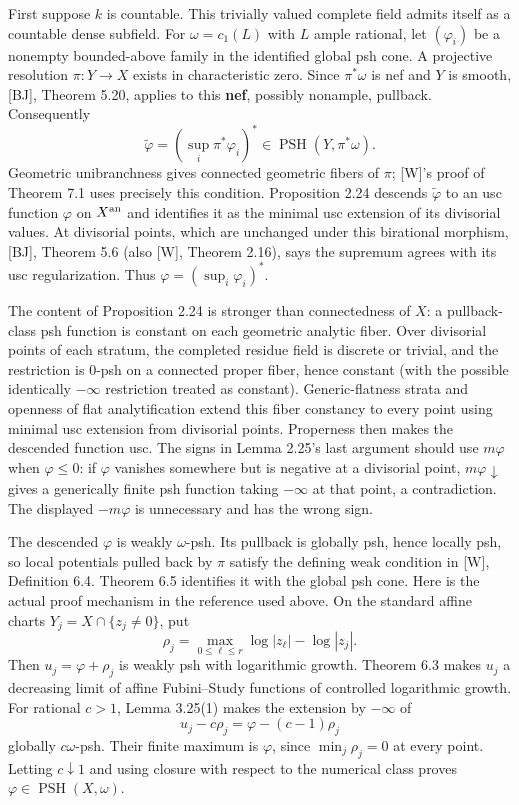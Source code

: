 \documentclass[11pt]{article}
\begin{document}
First suppose \(k\) is countable. This trivially valued complete field
admits itself as a countable dense subfield. For \(\omega=c_1(L)\) with
\(L\) ample rational, let \((\varphi_i)\) be a nonempty bounded-above
family in the identified global psh cone. A projective resolution
\(\pi:Y\to X\) exists in characteristic zero. Since \(\pi^*\omega\) is
nef and \(Y\) is smooth, {[}BJ{]}, Theorem 5.20, applies to this
\textbf{nef}, possibly nonample, pullback. Consequently
\[\widetilde\varphi=\left(\sup_i\pi^*\varphi_i\right)^*\in\operatorname{PSH}(Y,\pi^*\omega).\]
Geometric unibranchness gives connected geometric fibers of \(\pi\);
{[}W{]}'s proof of Theorem 7.1 uses precisely this condition.
Proposition 2.24 descends \(\widetilde\varphi\) to an usc function
\(\varphi\) on \(X^{\rm an}\) and identifies it as the minimal usc
extension of its divisorial values. At divisorial points, which are
unchanged under this birational morphism, {[}BJ{]}, Theorem 5.6 (also
{[}W{]}, Theorem 2.16), says the supremum agrees with its usc
regularization. Thus \(\varphi=(\sup_i\varphi_i)^*\).

The content of Proposition 2.24 is stronger than connectedness of \(X\):
a pullback-class psh function is constant on each geometric analytic
fiber. Over divisorial points of each stratum, the completed residue
field is discrete or trivial, and the restriction is \(0\)-psh on a
connected proper fiber, hence constant (with the possible identically
\(-\infty\) restriction treated as constant). Generic-flatness strata
and openness of flat analytification extend this fiber constancy to
every point using minimal usc extension from divisorial points.
Properness then makes the descended function usc. The signs in Lemma
2.25's last argument should use \(m\varphi\) when \(\varphi\leq0\): if
\(\varphi\) vanishes somewhere but is negative at a divisorial point,
\(m\varphi\downarrow\) gives a generically finite psh function taking
\(-\infty\) at that point, a contradiction. The displayed \(-m\varphi\)
is unnecessary and has the wrong sign.

The descended \(\varphi\) is weakly \(\omega\)-psh. Its pullback is
globally psh, hence locally psh, so local potentials pulled back by
\(\pi\) satisfy the defining weak condition in {[}W{]}, Definition 6.4.
Theorem 6.5 identifies it with the global psh cone. Here is the actual
proof mechanism in the reference used above. On the standard affine
charts \(Y_j=X\cap\{z_j\ne0\}\), put
\[\rho_j=\max_{0\leq\ell\leq r}\log|z_\ell|-\log|z_j|.\] Then
\(u_j=\varphi+\rho_j\) is weakly psh with logarithmic growth. Theorem
6.3 makes \(u_j\) a decreasing limit of affine Fubini--Study functions
of controlled logarithmic growth. For rational \(c>1\), Lemma 3.25(1)
makes the extension by \(-\infty\) of
\[u_j-c\rho_j=\varphi-(c-1)\rho_j\] globally \(c\omega\)-psh. Their
finite maximum is \(\varphi\), since \(\min_j\rho_j=0\) at every point.
Letting \(c\downarrow1\) and using closure with respect to the numerical
class proves \(\varphi\in\operatorname{PSH}(X,\omega)\).
\end{document}
